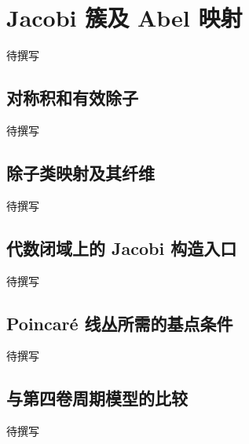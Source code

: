 
% 
% 
% 

\section{Jacobi 簇及 Abel 映射}
\label{g5:sec:2404}

待撰写

\subsection{对称积和有效除子}
\label{g5:subsec:2404:01}
待撰写

\subsection{除子类映射及其纤维}
\label{g5:subsec:2404:02}
待撰写

\subsection{代数闭域上的 Jacobi 构造入口}
\label{g5:subsec:2404:03}
待撰写

\subsection{Poincaré 线丛所需的基点条件}
\label{g5:subsec:2404:04}
待撰写

\subsection{与第四卷周期模型的比较}
\label{g5:subsec:2404:05}
待撰写
